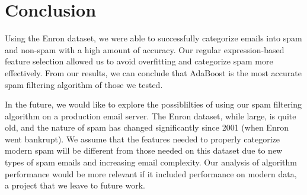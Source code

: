 \section{Conclusion}
Using the Enron dataset, we were able to successfully categorize emails into spam and non-spam with a high amount of accuracy. Our regular expression-based feature selection allowed us to avoid overfitting and categorize spam more effectively.  From our results, we can conclude that AdaBoost is the most accurate spam filtering algorithm of those we tested.

In the future, we would like to explore the possiblilties of using our spam filtering algorithm on a production email server. The Enron dataset, while large, is quite old, and the nature of spam has changed significantly since 2001 (when Enron went bankrupt). We assume that the features needed to properly categorize modern spam will be different from those needed on this dataset due to new types of spam emails and increasing email complexity. Our analysis of algorithm performance would be more relevant if it included performance on modern data, a project that we leave to future work.